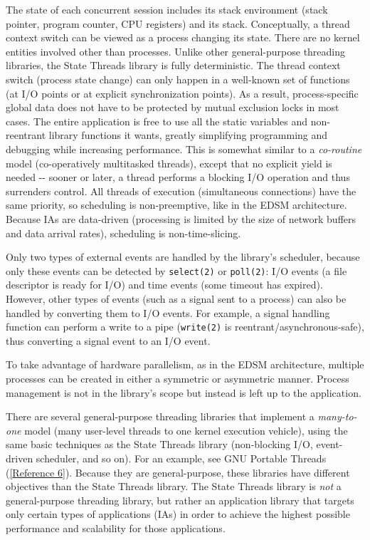 \documentclass[a4paper,12pt,notitlepage,twoside,openright]{article}
\begin{document}
The state of each concurrent session includes its stack environment
(stack pointer, program counter, CPU registers) and its stack.
Conceptually, a thread context switch can be viewed as a process
changing its state. There are no kernel entities involved other than
processes. Unlike other general-purpose threading libraries, the State
Threads library is fully deterministic. The thread context switch
(process state change) can only happen in a well-known set of functions
(at I/O points or at explicit synchronization points). As a result,
process-specific global data does not have to be protected by mutual
exclusion locks in most cases. The entire application is free to use all
the static variables and non-reentrant library functions it wants,
greatly simplifying programming and debugging while increasing
performance. This is somewhat similar to a \emph{co-routine} model
(co-operatively multitasked threads), except that no explicit yield is
needed -\/- sooner or later, a thread performs a blocking I/O operation
and thus surrenders control. All threads of execution (simultaneous
connections) have the same priority, so scheduling is non-preemptive,
like in the EDSM architecture. Because IAs are data-driven (processing
is limited by the size of network buffers and data arrival rates),
scheduling is non-time-slicing.

Only two types of external events are handled by the library's
scheduler, because only these events can be detected by
\texttt{select(2)} or \texttt{poll(2)}: I/O events (a file descriptor is
ready for I/O) and time events (some timeout has expired). However,
other types of events (such as a signal sent to a process) can also be
handled by converting them to I/O events. For example, a signal handling
function can perform a write to a pipe (\texttt{write(2)} is
reentrant/asynchronous-safe), thus converting a signal event to an I/O
event.

To take advantage of hardware parallelism, as in the EDSM architecture,
multiple processes can be created in either a symmetric or asymmetric
manner. Process management is not in the library's scope but instead is
left up to the application.

There are several general-purpose threading libraries that implement a
\emph{many-to-one} model (many user-level threads to one kernel
execution vehicle), using the same basic techniques as the State Threads
library (non-blocking I/O, event-driven scheduler, and so on). For an
example, see GNU Portable Threads
(\protect\hyperlink{refs6}{{[}Reference 6{]}}). Because they are
general-purpose, these libraries have different objectives than the
State Threads library. The State Threads library is \emph{not} a
general-purpose threading library, but rather an application library
that targets only certain types of applications (IAs) in order to
achieve the highest possible performance and scalability for those
applications.
\end{document}
